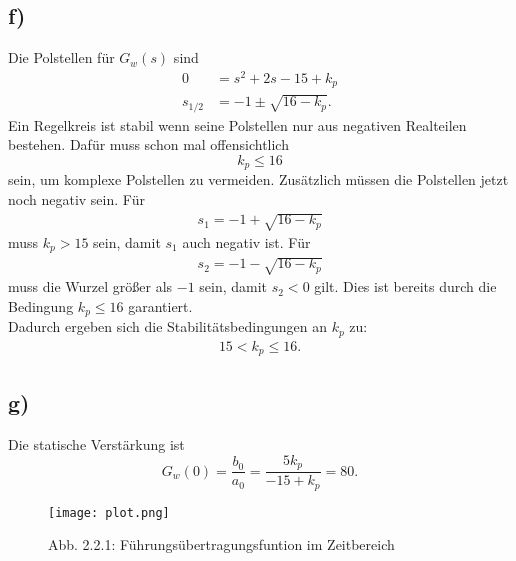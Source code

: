 \documentclass[11pt]{scrartcl} %
\begin{document}
\subsection*{f)}
Die Polstellen für $G_w(s)$ sind
\begin{align*}
0&=s^2+2s-15+k_p\\
s_{1/2}&=-1\pm\sqrt{16-k_p}.
\end{align*}
Ein Regelkreis ist stabil wenn seine Polstellen nur aus negativen Realteilen bestehen. Dafür muss schon mal offensichtlich
\begin{equation*}
k_p \leq 16
\end{equation*}
sein, um komplexe Polstellen zu vermeiden. Zusätzlich müssen die Polstellen jetzt noch negativ sein. Für 
\begin{align*}
s_1 = -1 + \sqrt{16-k_p}
\end{align*}
muss $k_p > 15$ sein, damit $s_1$ auch negativ ist. Für
\begin{align*}
s_2 = -1 - \sqrt{16-k_p}
\end{align*}
muss die Wurzel größer als $-1$ sein, damit $s_2<0$ gilt. Dies ist bereits durch die Bedingung $k_p \leq 16$ garantiert.\\
Dadurch ergeben sich die Stabilitätsbedingungen an $k_p$ zu:
\begin{align*}
15 < k_p \leq 16.
\end{align*}
\subsection*{g)}
Die statische Verstärkung ist
\begin{equation*}
G_w(0)=\dfrac{b_0}{a_0} = \dfrac{5k_p}{-15+k_p} = 80.
\end{equation*}
\begin{figure}[H]
	\centering
	\texttt{[image: plot.png]}
	\captionsetup{labelformat=empty}
	\caption{Abb. 2.2.1: Führungsübertragungsfuntion im Zeitbereich}
\end{figure}
\end{document}
